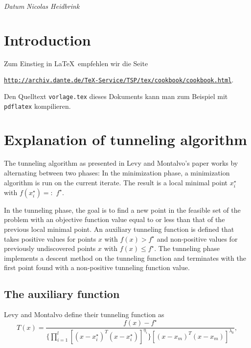 \documentclass[a4paper,12pt,twoside]{article}
\begin{document}
\vspace*{3eM}

\textit{Datum} \hspace{8cm} \textit{Nicolas Heidbrink}
\thispagestyle{empty}
\clearpage{\thispagestyle{empty}\cleardoublepage}


\setcounter{page}{3}

\tableofcontents

\clearpage{\thispagestyle{empty}\cleardoublepage}

\section{Introduction}

Zum Einstieg in \LaTeX\ empfehlen wir die Seite

\href{http://archiv.dante.de/TeX-Service/TSP/tex/cookbook/cookbook.html}{\texttt{http://archiv.dante.de/TeX-Service/TSP/tex/cookbook/cookbook.html}}.

Den Quelltext \texttt{vorlage.tex} dieses Dokuments kann man zum Beispiel mit \texttt{pdflatex} kompilieren.


\section{Explanation of tunneling algorithm}

The tunneling algorithm as presented in Levy and Montalvo's paper \cite{levy_tunneling_1985} works by alternating between two phases: In the minimization phase, a minimization algorithm is run on the current iterate. The result is a local minimal point $x_i^\star$ with $f(x_i^\star) =:$ $f^\star$.

In the tunneling phase, the goal is to find a new point in the feasible set of the problem with an objective function value equal to or less than that of the previous local minimal point. An auxiliary tunneling function is defined that takes positive values for points $x$ with $f(x) > f^\star$ and non-positive values for previously undiscovered points $x$ with $f(x) \leq f^\star$. The tunneling phase implements a descent method on the tunneling function and terminates with the first point found with a non-positive tunneling function value.



\subsection{The auxiliary function}
Levy and Montalvo define their tunneling function as \cite[Eq. A.4]{levy_tunneling_1985}
\begin{equation} \label{eq:t}
    T(x) = \frac{
        f(x) - f^\star}{ 
        \{ \prod_{i = 1}^l [(x - x^\star_i)^T(x - x^\star_i)]^{\eta_i} \} 
        [(x-x_m)^T(x-x_m)]^{\lambda_0}},
\end{equation}
\end{document}
